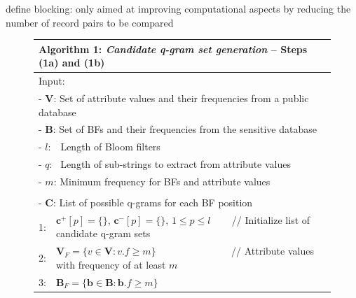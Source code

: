 \documentclass{llncs}
\begin{document}
define blocking: only aimed at improving computational aspects by reducing the number of record pairs to be compared







\begin{figure}[t]
  \begin{center}
  \begin{scriptsize}
  \begin{tabular}{ll} \hline
\multicolumn{2}{l}{\textbf{Algorithm 1: \emph{Candidate q-gram set
  generation}} -- Steps (1a) and (1b) } \\ \hline
\multicolumn{2}{l}{Input:} \\
\multicolumn{2}{l}{- $\mathbf{V}$: Set of attribute values and their
  frequencies from a public database} \\
\multicolumn{2}{l}{- $\mathbf{B}$: Set of BFs and their
  frequencies from the sensitive database} \\
\multicolumn{2}{l}{- $l$:~\, Length of Bloom filters} \\
\multicolumn{2}{l}{- $q$:~ Length of sub-strings to extract from
  attribute values} \\  
\multicolumn{2}{l}{- $m$: Minimum frequency for BFs and attribute
  values} \\
\noalign{\smallskip}
\multicolumn{2}{l}{Output:} \\
\multicolumn{2}{l}{- $\mathbf{C}$: List of possible q-grams for each
  BF position} \\
\noalign{\smallskip}
  1:  & $\mathbf{c}^+[p] = \{\}$, $\mathbf{c}^-[p] = \{\}$,
        $1 \le p \le l$ ~~~ // Initialize list of candidate q-gram
        sets \\
  2:  & $\mathbf{V}_F = \{v \in \mathbf{V}: v.f \ge m \}$
        ~~~~~~~~~~~~~~ // Attribute values with frequency of at
        least $m$ \\
  3:  & $\mathbf{B}_F = \{\mathbf{b} \in \mathbf{B}:
        \mathbf{b}.f \ge m \}$

\end{tabular}
\end{scriptsize}
\end{center}
\end{figure}
\end{document}
